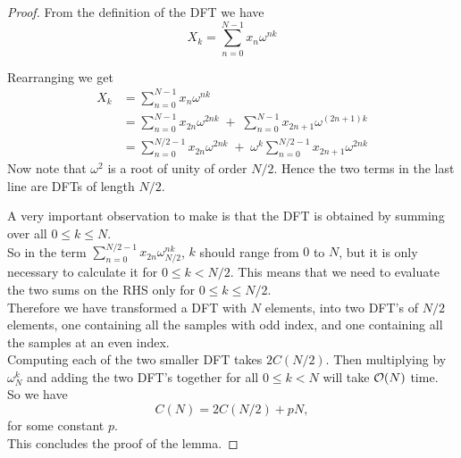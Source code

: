 \begin{proof}
From the definition of the DFT we have
\[
    X_k = \sum^{N-1}_{n=0}x_n\omega^{nk}
\]

Rearranging we get
\begin{align}
    X_k
    &= \sum^{N-1}_{n=0}x_n\omega^{nk} \nonumber\\
    &= \sum^{N-1}_{n=0}x_{2n}\omega^{2nk} \;+\; \sum^{N-1}_{n=0}x_{2n+1} \omega^{(2n+1)k} \nonumber\\
    &= \sum^{N/2-1}_{n=0}x_{2n}\omega^{2nk} \;+\; \omega^k \sum^{N/2-1}_{n=0}x_{2n+1}\omega^{2nk} \label{eq:keystep}
\end{align}
Now note that $\omega^2$ is a root of unity of order $N/2$. Hence the two terms in the last line are DFTs of length $N/2$.

A very important observation to make is that the DFT is obtained by summing over all $0\leq k \leq N$.\\

So in the term $\sum^{N/2-1}_{n=0}x_{2n}\omega^{nk}_{N/2}$, $k$ should range from $0$ to $N$, but it is only necessary to calculate it for $0 \leq k < N/2$. This means that we need to evaluate the two sums on the RHS only for $0 \leq k \leq N/2$.\\

Therefore we have transformed a DFT with $N$ elements, into two DFT's of $N/2$ elements, one containing all the samples with odd index, and one containing all the samples at an even index.\\
Computing each of the two smaller DFT takes $2C(N/2)$. Then multiplying by $\omega^k_N$ and adding the two DFT's together for all $0 \leq k < N$ will take $\mathcal O(N)$ time. \\
So we have
\[
    C(N) = 2 C(N/2) + pN, \label{eq:recurse}
\]
for some constant $p$.\\
This concludes the proof of the lemma.
\end{proof}





